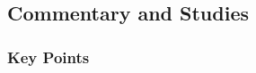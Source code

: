 

	
	
	
	
\subsection{Commentary and Studies} %
	\label{BOOKOFABRAHAM-COMMENTARY}

	\subsubsection{Key Points}
		\label{BOOKOFABRAHAM-KEYS}
	
